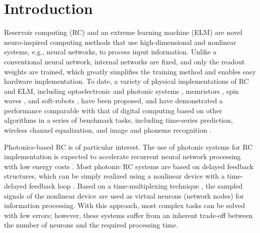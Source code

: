 \documentclass{article}
\begin{document}

\section{Introduction}
%
Reservoir computing (RC) \cite{Versraeten2007,Jaeger2004,Maass2002} and
an extreme learning machine (ELM) \cite{Huang2006} are
novel neuro-inspired computing methods that use high-dimensional 
and nonlinear systems, e.g., neural networks, to process input information.
%
Unlike a conventional neural network, internal networks are fixed, and
only the readout weights are trained, which greatly simplifies the training method 
and enables easy hardware implementation.
%
To date, a variety of physical implementations of RC and ELM, including
optoelectronic and photonic systems \cite{Ortin2015}, memristors \cite{Du2017}, 
spin waves \cite{Nakane2018}, and soft-robots \cite{Nakajima2015}, 
have been proposed, and have demonstrated a performance comparable with that of digital computing
based on other algorithms in a series of benchmark tasks, 
including time-series prediction, wireless channel equalization, and image and
phoneme recognition \cite{Tanaka2019}. 
%

Photonics-based RC is of particular interest. 
%
The use of photonic systems for RC implementation is expected to accelerate 
recurrent neural network processing with low energy costs \cite{GVderSande2017,Kitayama2019}. 
%
Most photonic RC systems are based on delayed feedback structures,
which can be simply realized using a nonlinear device with a time-delayed
feedback loop
\cite{Larger2017,Brunner2013,Larger2012,Uchida2020,Takano2018,Vinckier2015,Sugano2020}. 
%
Based on a time-multiplexing technique \cite{Appeltant2011,Paquot2012}, 
the sampled signals of the nonlinear device are used as virtual neurons
(network nodes) for information processing. 
%
With this approach, most complex tasks can be solved with few errors; however, 
these systems suffer from an inherent trade-off between the number of
neurons and the required processing time. 
\end{document}
